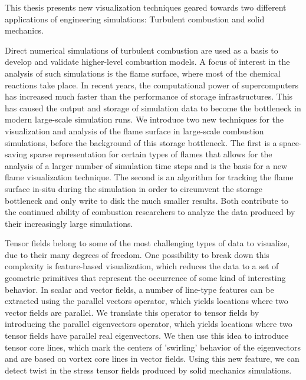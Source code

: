 %
This thesis presents new visualization techniques geared towards two different
applications of engineering simulations: Turbulent combustion and solid
mechanics.
%

%
Direct numerical simulations of turbulent combustion are used as a basis to
develop and validate higher-level combustion models.
%
A focus of interest in the analysis of such simulations is the flame surface,
where most of the chemical reactions take place.
%
In recent years, the computational power of supercomputers has increased much
faster than the performance of storage infrastructures.
%
This has caused the output and storage of simulation data to become the
bottleneck in modern large-scale simulation runs.
%
We introduce two new techniques for the visualization and analysis of the flame
surface in large-scale combustion simulations, before the background of this
storage bottleneck.
%
The first is a space-saving sparse representation for certain types of flames
that allows for the analysis of a larger number of simulation time steps and is
the basis for a new flame visualization technique.
%
The second is an algorithm for tracking the flame surface in-situ during the
simulation in order to circumvent the storage bottleneck and only write to disk
the much smaller results.
%
Both contribute to the continued ability of combustion researchers to analyze
the data produced by their increasingly large simulations.
%

%
Tensor fields belong to some of the most challenging types of data to
visualize, due to their many degrees of freedom.
%
One possibility to break down this complexity is feature-based visualization,
which reduces the data to a set of geometric primitives that represent the
occurrence of some kind of interesting behavior.
%
In scalar and vector fields, a number of line-type features can be extracted
using the parallel vectors operator, which yields locations where two vector
fields are parallel.
%
We translate this operator to tensor fields by introducing the parallel
eigenvectors operator, which yields locations where two tensor fields have
parallel real eigenvectors.
%
We then use this idea to introduce tensor core lines, which mark the centers of
'swirling' behavior of the eigenvectors and are based on vortex core lines in
vector fields.
%
Using this new feature, we can detect twist in the stress tensor fields
produced by solid mechanics simulations.
%